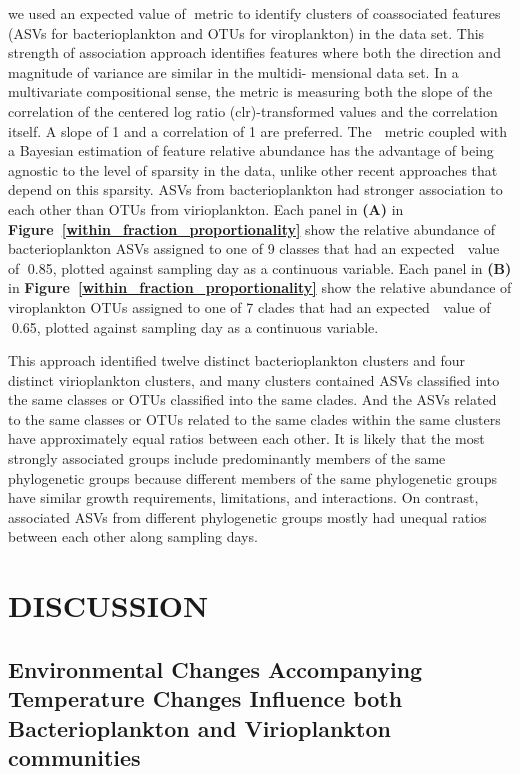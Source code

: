 \documentclass[a4,center,fleqn]{NAR}
\begin{document}
we used an expected value of 􏰄metric to identify clusters of coassociated features (ASVs for bacterioplankton and OTUs for viroplankton) in the data set. 
This strength of association approach identifies features where both the direction and magnitude of variance are similar in the multidi- mensional data set. 
In a multivariate compositional sense, the metric is measuring both the slope of the correlation of the centered log ratio (clr)-transformed values and the correlation itself. 
A slope of 1 and a correlation of 1 are preferred. 
The 􏰄 metric coupled with a Bayesian estimation of feature relative abundance has the advantage of being agnostic to the level of sparsity in the data, unlike other recent approaches that depend on this sparsity.
ASVs from bacterioplankton had stronger association to each other than OTUs from virioplankton.
Each panel in \textbf{(A)} in \textbf{Figure~\ref{within_fraction_proportionality}} show the relative abundance of bacterioplankton ASVs assigned to one of 9 classes that had an expected 􏰄 value of 􏰀0.85, plotted against sampling day as a continuous variable. 
Each panel in \textbf{(B)} in \textbf{Figure~\ref{within_fraction_proportionality}} show the relative abundance of viroplankton OTUs assigned to one of 7 clades that had an expected 􏰄 value of 􏰀0.65, plotted against sampling day as a continuous variable.

This approach identified twelve distinct bacterioplankton clusters and four distinct virioplankton clusters, and many clusters contained ASVs classified into the same classes or OTUs classified into the same clades. 
And the ASVs related to the same classes or OTUs related to the same clades within the same clusters have approximately equal ratios between each other.
It is likely that the most strongly associated groups include predominantly members of the same phylogenetic groups because different members of the same phylogenetic groups have similar growth requirements, limitations, and interactions.
On contrast, associated ASVs from different phylogenetic groups mostly had unequal ratios between each other along sampling days.


\section{DISCUSSION}

\subsection{Environmental Changes Accompanying Temperature Changes Influence both Bacterioplankton and Virioplankton communities}
\end{document}
